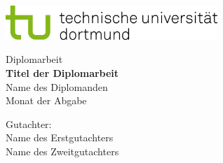 \begin{titlepage}
\vspace*{-2cm}
\newlength{\links}
\setlength{\links}{-1.5cm}
\sffamily
\hspace*{\links}
\begin{minipage}{12.5cm}
\includegraphics[width=8cm]{bilder/tud_logo_rgb}
\end{minipage}

\vspace*{4cm}

\hspace*{\links}
\hspace*{-0.2cm}
\begin{minipage}{9cm}
\large
\begin{center}
{\Large Diplomarbeit} \\
\vspace*{1cm}
\textbf{Titel der Diplomarbeit} \\
\vspace*{1cm}
Name des Diplomanden\\
Monat der Abgabe
\end{center}
\end{minipage}
\normalsize
\vspace*{5.5cm}


\vspace*{2.1cm}

\hspace*{\links}
\begin{minipage}[b]{5cm}
\raggedright
Gutachter: \\
Name des Erstgutachters \\
Name des Zweitgutachters \\
\end{minipage}


\end{titlepage}
